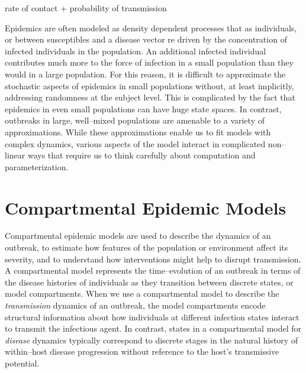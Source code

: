 rate of contact + probability of transmission 

Epidemics are often modeled as density dependent processes that as individuals, or between susceptibles and a disease vector \cite{dejong1995does,hu2013scaling,mccallum2001should}re driven by the concentration of infected individuals in the population. An additional infected individual contributes much more to the force of infection in a small population than they would in a large population. For this reason, it is difficult to approximate the stochastic aspects of epidemics in small populations without, at least implicitly, addressing randomness at the subject level. This is complicated by the fact that epidemics in even small populations can have huge state spaces. In contrast, outbreaks in large, well--mixed populations are amenable to a variety of approximations. While these approximations enable us to fit models with complex dynamics, various aspects of the model interact in complicated non--linear ways that require us to think carefully about computation and parameterization. 

\section{Compartmental Epidemic Models}
\label{sec:outbreak_models}

Compartmental epidemic models are used to describe the dynamics of an outbreak, to estimate how features of the population or environment affect its severity, and to understand how interventions might help to disrupt transmission. A compartmental model represents the time--evolution of an outbreak in terms of the disease histories of individuals as they transition between discrete states, or model compartments. When we use a compartmental model to describe the \textit{transmission} dynamics of an outbreak, the model compartments encode structural information about how individuals at different infection states interact to transmit the infectious agent. In contrast, states in a compartmental model for \textit{disease} dynamics typically correspond to discrete stages in the natural history of within--host disease progression without reference to the host's transmissive potential. 


